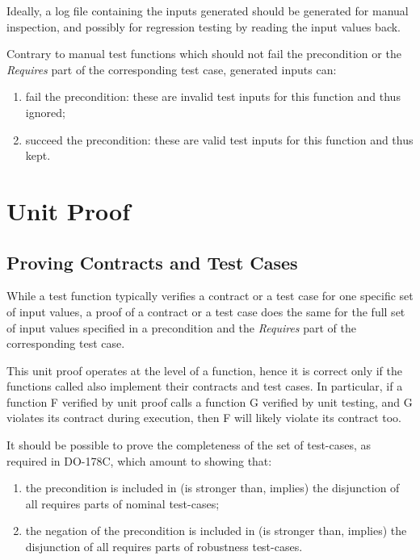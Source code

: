 \documentclass{article}
\begin{document}
Ideally, a log file containing the inputs generated should be generated for
manual inspection, and possibly for regression testing by reading the input
values back.

Contrary to manual test functions which should not fail the precondition or
the \textit{Requires} part of the corresponding test case, generated inputs
can:
\begin{enumerate}
\item fail the precondition: these are invalid test inputs for this
  function and thus ignored;
\item succeed the precondition: these are valid test inputs for this function
  and thus kept.
\end{enumerate}

\section{Unit Proof}

\subsection{Proving Contracts and Test Cases}

While a test function typically verifies a contract or a test case for one
specific set of input values, a proof of a contract or a test case does the
same for the full set of input values specified in a precondition and the
\textit{Requires} part of the corresponding test case.

This unit proof operates at the level of a function, hence it is correct only
if the functions called also implement their contracts and test cases. In
particular, if a function F verified by unit proof calls a function G
verified by unit testing, and G violates its contract during execution, then F
will likely violate its contract too.

It should be possible to prove the completeness of the set of test-cases, as
required in DO-178C, which amount to showing that:
\begin{enumerate}
\item the precondition is included in (is stronger than, implies) the
  disjunction of all requires parts of nominal test-cases;
\item the negation of the precondition is included in (is stronger than,
  implies) the disjunction of all requires parts of robustness test-cases.
\end{enumerate}
\end{document}
